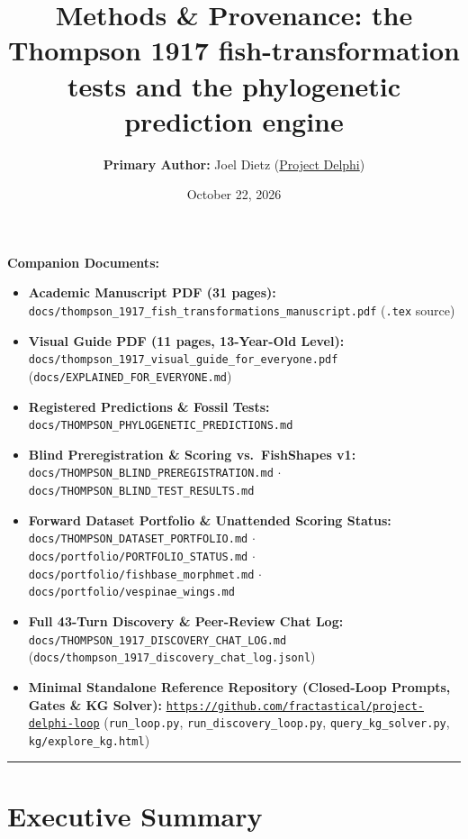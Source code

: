\documentclass[10.5pt,a4paper]{article}
\title{\textbf{Methods \& Provenance: the Thompson 1917 fish-transformation tests and the phylogenetic prediction engine}}
\author{\textbf{Primary Author:} Joel Dietz (\href{https://github.com/fractastical/morpholib}{Project Delphi})}
\date{October 22, 2026}
\newcommand{\code}[1]{{\footnotesize\nolinkurl{#1}}}
\begin{document}
\maketitle

\noindent\textbf{Companion Documents:}
\begin{itemize}
  \setlength{\itemsep}{2pt}
  \item \textbf{Academic Manuscript PDF (31 pages):} \code{docs/thompson_1917_fish_transformations_manuscript.pdf} (\texttt{.tex} source)
  \item \textbf{Visual Guide PDF (11 pages, 13-Year-Old Level):} \code{docs/thompson_1917_visual_guide_for_everyone.pdf} (\code{docs/EXPLAINED_FOR_EVERYONE.md})
  \item \textbf{Registered Predictions \& Fossil Tests:} \code{docs/THOMPSON_PHYLOGENETIC_PREDICTIONS.md}
  \item \textbf{Blind Preregistration \& Scoring vs.\ FishShapes v1:} \code{docs/THOMPSON_BLIND_PREREGISTRATION.md} $\cdot$ \code{docs/THOMPSON_BLIND_TEST_RESULTS.md}
  \item \textbf{Forward Dataset Portfolio \& Unattended Scoring Status:} \code{docs/THOMPSON_DATASET_PORTFOLIO.md} $\cdot$ \code{docs/portfolio/PORTFOLIO_STATUS.md} $\cdot$ \code{docs/portfolio/fishbase_morphmet.md} $\cdot$ \code{docs/portfolio/vespinae_wings.md}
  \item \textbf{Full 43-Turn Discovery \& Peer-Review Chat Log:} \code{docs/THOMPSON_1917_DISCOVERY_CHAT_LOG.md} (\code{docs/thompson_1917_discovery_chat_log.jsonl})
  \item \textbf{Minimal Standalone Reference Repository (Closed-Loop Prompts, Gates \& KG Solver):} \href{https://github.com/fractastical/project-delphi-loop}{\code{https://github.com/fractastical/project-delphi-loop}} (\code{run_loop.py}, \code{run_discovery_loop.py}, \code{query_kg_solver.py}, \code{kg/explore_kg.html})
\end{itemize}

\vspace{0.3em}
\hrule
\vspace{0.5em}

\section*{Executive Summary}
\end{document}
